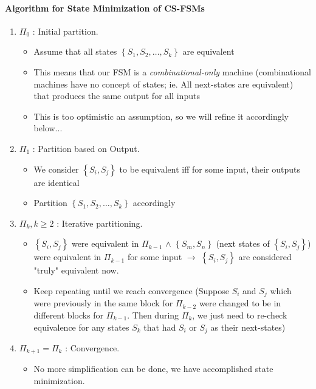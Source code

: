 \documentclass{article}
\begin{document}
\newpage
\paragraph{Algorithm for State Minimization of CS-FSMs}
\begin{enumerate}
    \item $\Pi_{0}$ : Initial partition.
        \begin{itemize}
            \item Assume that all states $ \left\{ S_{1}, S_{2}, \dots, S_{k} \right\} $ are equivalent
            \item This means that our FSM is a \textit{combinational-only} machine (combinational machines have no concept of states; ie. All next-states are equivalent)
                  that produces the same output for all inputs
            \item This is too optimistic an assumption, so we will refine it accordingly below...
        \end{itemize}
    \item $\Pi_{1}$ : Partition based on Output.
        \begin{itemize}
            \item We consider $ \left\{ S_{i},S_{j} \right\} $ to be equivalent iff for some input, their outputs are identical
            \item Partition $ \left\{ S_{1}, S_{2}, \dots, S_{k} \right\} $ accordingly
        \end{itemize}
    \item $\Pi_{k}, k \ge 2$ : Iterative partitioning. 
        \begin{itemize}
            \item $ \left\{ S_{i},S_{j} \right\} $ were equivalent in $\Pi_{k-1}$ $\wedge$ 
                  $ \left\{ S_{m},S_{n} \right\} $ (next states of $ \left\{ S_{i},S_{j} \right\} $) were equivalent in $\Pi_{k-1}$ for some input
                  $\longrightarrow$ $ \left\{ S_{i},S_{j} \right\} $ are considered "truly" equivalent now.
            \item Keep repeating until we reach convergence (Suppose $S_{i}$ and $S_{j}$ which were previously in the same block for $\Pi_{k-2}$ were changed to be in different blocks for $\Pi_{k-1}$.
                    Then during $\Pi_{k}$, we just need to re-check equivalence for any states $S_{k}$ that had $S_{i}$ or $S_{j}$ as their next-states)
        \end{itemize}
    \item $\Pi_{k+1} = \Pi_{k}$ : Convergence.
        \begin{itemize}
            \item No more simplification can be done, we have accomplished state minimization.
        \end{itemize}
\end{enumerate}
\end{document}
